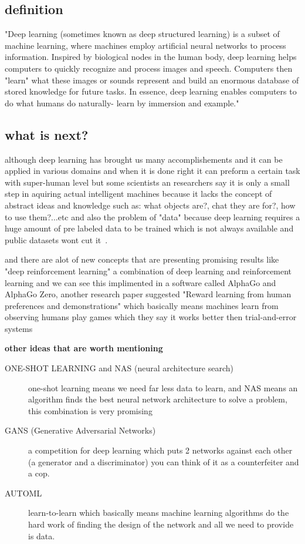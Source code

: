     \subsection{definition}
        "Deep learning (sometimes known as deep structured learning) is a subset of machine learning, where machines employ artificial neural networks to process information. Inspired by biological nodes in the human body, deep learning helps computers to quickly recognize and process images and speech. Computers then "learn" what these images or sounds represent and build an enormous database of stored knowledge for future tasks. In essence, deep learning enables computers to do what humans do naturally- learn by immersion and example."~\cite{dl}

    \subsection{what is next?}
        although deep learning has brought us many accomplishements and it can be applied in various domains and when it is done right it can preform a certain task with super-human level but some scientists an researchers say it is only a small step in aquiring actual intelligent machines because it lacks the concept of abstract ideas and knowledge such as: what objects are?, chat they are for?, how to use them?...etc
        and also the problem of "data" because deep learning requires a huge amount of pre labeled data to be trained which is not always available and public datasets wont cut it~\cite{dl}.

        and there are alot of new concepts that are presenting promising results like "deep reinforcement learning" a combination of deep learning and reinforcement learning and we can see this implimented in a software called AlphaGo and AlphaGo Zero, another research paper suggested  "Reward learning from human preferences and demonstrations" which basically means machines learn from observing humans play games which they say it works better then trial-and-error systems~\cite{dl}

        \bigskip \textbf{other ideas that are worth mentioning} ~\cite{dl}
            \begin{description}
            \item [ONE-SHOT LEARNING and NAS (neural architecture search)]
                one-shot learning means we need far less data to learn, and NAS means an algorithm finds the best neural network architecture to solve a problem, this combination is very promising
            \item [GANS (Generative Adversarial Networks)]
                a competition for deep learning which puts 2 networks against each other (a generator and a discriminator) you can think of it as a counterfeiter and a cop.
            \item [AUTOML]
                learn-to-learn which basically means machine learning algorithms do the hard work of finding the design of the network and all we need to provide is data.
            \end{description}


